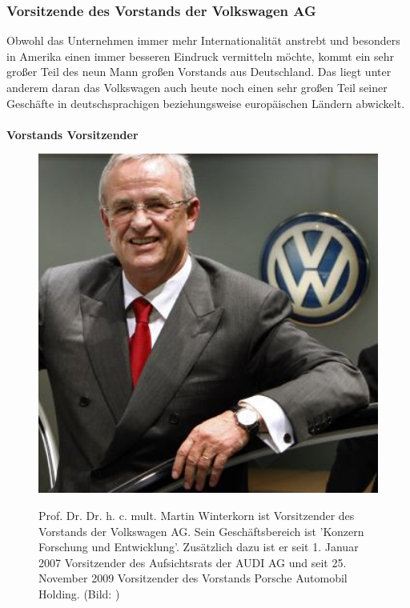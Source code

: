 \documentclass[12pt]{article}
\begin{document}
\subsubsection{Vorsitzende des Vorstands der Volkswagen AG}
Obwohl das Unternehmen immer mehr Internationalität anstrebt und besonders in Amerika einen immer besseren Eindruck vermitteln möchte, kommt ein sehr großer Teil des neun Mann großen Vorstands aus Deutschland. Das liegt unter anderem daran das Volkswagen auch heute noch einen sehr großen Teil seiner Geschäfte in deutschsprachigen beziehungsweise europäischen Ländern abwickelt.\cite{vorstand} \\ \\
\textbf{Vorstands Vorsitzender}
\begin{figure}[here!]
	\centering
	\begin{minipage}[h]{0.20\textwidth}
		\centering
		\includegraphics[width=1.0\textwidth]{images/MartinWinterkorn.jpg}
		\label{fig:vorstandvw0}
	\end{minipage}
		\begin{minipage}[h]{0.10\textwidth}
		\hspace{1cm} 
	\end{minipage}
	\begin{minipage}[h]{0.65\textwidth}
		Prof. Dr. Dr. h. c. mult. Martin Winterkorn ist Vorsitzender des Vorstands der Volkswagen AG. Sein Geschäftsbereich ist 'Konzern Forschung und Entwicklung'. Zusätzlich dazu ist er seit 1. Januar 2007 Vorsitzender des Aufsichtsrats der AUDI AG und seit 25. November 2009 Vorsitzender des Vorstands Porsche Automobil Holding. 		(Bild: \cite{mwpic} )

	\end{minipage}
\end{figure}\FloatBarrier\noindent
\end{document}

